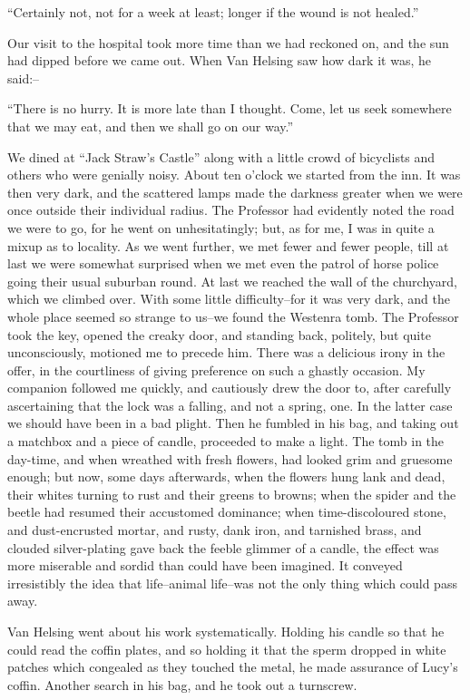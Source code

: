 \documentclass[12pt,openright]{book}
\begin{document}
“Certainly not, not for a week at least; longer if the wound is not healed.”

Our visit to the hospital took more time than we had reckoned on, and the sun had dipped before we came out. When Van Helsing saw how dark it was, he said:–

“There is no hurry. It is more late than I thought. Come, let us seek somewhere that we may eat, and then we shall go on our way.”

We dined at “Jack Straw’s Castle” along with a little crowd of bicyclists and others who were genially noisy. About ten o’clock we started from the inn. It was then very dark, and the scattered lamps made the darkness greater when we were once outside their individual radius. The Professor had evidently noted the road we were to go, for he went on unhesitatingly; but, as for me, I was in quite a mixup as to locality. As we went further, we met fewer and fewer people, till at last we were somewhat surprised when we met even the patrol of horse police going their usual suburban round. At last we reached the wall of the churchyard, which we climbed over. With some little difficulty–for it was very dark, and the whole place seemed so strange to us–we found the Westenra tomb. The Professor took the key, opened the creaky door, and standing back, politely, but quite unconsciously, motioned me to precede him. There was a delicious irony in the offer, in the courtliness of giving preference on such a ghastly occasion. My companion followed me quickly, and cautiously drew the door to, after carefully ascertaining that the lock was a falling, and not a spring, one. In the latter case we should have been in a bad plight. Then he fumbled in his bag, and taking out a matchbox and a piece of candle, proceeded to make a light. The tomb in the day-time, and when wreathed with fresh flowers, had looked grim and gruesome enough; but now, some days afterwards, when the flowers hung lank and dead, their whites turning to rust and their greens to browns; when the spider and the beetle had resumed their accustomed dominance; when time-discoloured stone, and dust-encrusted mortar, and rusty, dank iron, and tarnished brass, and clouded silver-plating gave back the feeble glimmer of a candle, the effect was more miserable and sordid than could have been imagined. It conveyed irresistibly the idea that life–animal life–was not the only thing which could pass away.

Van Helsing went about his work systematically. Holding his candle so that he could read the coffin plates, and so holding it that the sperm dropped in white patches which congealed as they touched the metal, he made assurance of Lucy’s coffin. Another search in his bag, and he took out a turnscrew.
\end{document}
